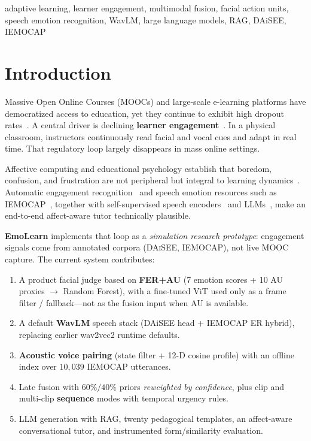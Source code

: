 \documentclass[conference]{IEEEtran}
\begin{document}
\begin{IEEEkeywords}
adaptive learning, learner engagement, multimodal fusion, facial action units,
speech emotion recognition, WavLM, large language models, RAG, DAiSEE, IEMOCAP
\end{IEEEkeywords}

\section{Introduction}

Massive Open Online Courses (MOOCs) and large-scale e-learning platforms have
democratized access to education, yet they continue to exhibit high dropout
rates~\cite{breslow2013studying,daniel2012making,onah2014dropout,jordan2015massive}.
A central driver is declining \textbf{learner
engagement}~\cite{kizilcec2013deconstructing,hew2016promoting}. In a physical
classroom, instructors continuously read facial and vocal cues and adapt in
real time. That regulatory loop largely disappears in mass online settings.

Affective computing and educational psychology establish that boredom,
confusion, and frustration are not peripheral but integral to learning
dynamics~\cite{picard1997affective,pekrun2006control,dmello2012dynamics,baker2010better,dmello2015review}.
Automatic engagement recognition~\cite{whitehill2014faces,gupta2016daisee} and
speech emotion resources such as \textsc{IEMOCAP}~\cite{busso2008iemocap},
together with self-supervised speech encoders~\cite{chen2022wavlm} and
LLMs~\cite{brown2020language,kasneci2023chatgpt,lewis2020retrieval}, make an
end-to-end affect-aware tutor technically plausible.

\textbf{EmoLearn} implements that loop as a \emph{simulation research
prototype}: engagement signals come from annotated corpora
(\textsc{DAiSEE}, \textsc{IEMOCAP}), not live MOOC capture. The current system
contributes:
\begin{enumerate}
\item A product facial judge based on \textbf{FER+AU} (7 emotion scores + 10 AU
proxies $\rightarrow$ Random Forest), with a fine-tuned ViT used only as a
frame filter / fallback---not as the fusion input when AU is available.
\item A default \textbf{WavLM} speech stack (DAiSEE head + IEMOCAP ER hybrid),
replacing earlier wav2vec2 runtime defaults.
\item \textbf{Acoustic voice pairing} (state filter + 12-D cosine profile) with
an offline index over $10{,}039$ IEMOCAP utterances.
\item Late fusion with $60\%/40\%$ priors \emph{reweighted by confidence}, plus
clip and multi-clip \textbf{sequence} modes with temporal urgency rules.
\item LLM generation with RAG, twenty pedagogical templates, an affect-aware
conversational tutor, and instrumented form/similarity evaluation.
\end{enumerate}
\end{document}

